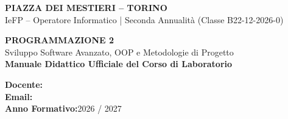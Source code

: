 \documentclass[11pt,a4paper,openany]{book}
\begin{document}
\begin{titlepage}
  \pagecolor{PiazzaPaper}

  \begin{flushleft}
    {\fontsize{13}{16}\selectfont\bfseries\color{PiazzaPrimary}PIAZZA DEI MESTIERI -- TORINO}\\[0.25em]
    {\fontsize{10}{13}\selectfont\color{PiazzaGray}IeFP -- Operatore Informatico | Seconda Annualità (Classe B22-12-2026-0)}
  \end{flushleft}

  \vspace{3.5cm}

  \noindent{\color{PiazzaPrimary}\rule{\textwidth}{3pt}}
  \vspace{1.5cm}

  \begin{flushleft}
    {\fontsize{34}{40}\selectfont\bfseries\color{PiazzaDark}PROGRAMMAZIONE 2}\\[0.5em]
    {\fontsize{18}{22}\selectfont\color{PiazzaGray}Sviluppo Software Avanzato, OOP e Metodologie di Progetto}\\[1.5em]
    {\fontsize{11}{14}\selectfont\color{PiazzaPrimary}\bfseries Manuale Didattico Ufficiale del Corso di Laboratorio}
  \end{flushleft}

  \vspace{1.5cm}
  \noindent{\color{PiazzaPrimary!40}\rule{\textwidth}{1pt}}

  \vfill

  \begin{flushleft}
    \textbf{\color{PiazzaDark}Docente:}\\
    \textbf{\color{PiazzaDark}Email:}\\
    \textbf{\color{PiazzaDark}Anno Formativo:}\hspace{0.5em}2026 / 2027
  \end{flushleft}

  \restoregeometry
\end{titlepage}
\pagecolor{white}

\frontmatter
\end{document}
